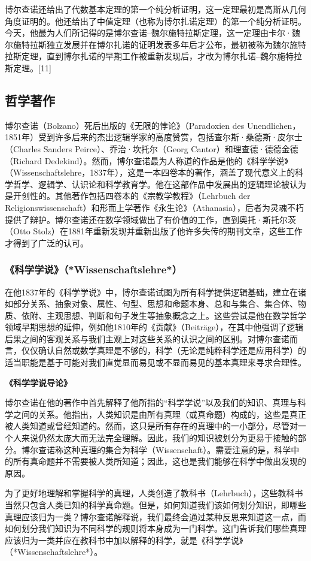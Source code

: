 博尔查诺还给出了代数基本定理的第一个纯分析证明，这一定理最初是高斯从几何角度证明的。他还给出了中值定理（也称为博尔扎诺定理）的第一个纯分析证明。今天，他最为人们所记得的是博尔查诺–魏尔施特拉斯定理，这一定理由卡尔·魏尔施特拉斯独立发展并在博尔扎诺的证明发表多年后才公布，最初被称为魏尔施特拉斯定理，直到博尔扎诺的早期工作被重新发现后，才改为博尔扎诺–魏尔施特拉斯定理。[11]
\subsection{哲学著作}  
博尔查诺（Bolzano）死后出版的《无限的悖论》（Paradoxien des Unendlichen，1851年）受到许多后来的杰出逻辑学家的高度赞赏，包括查尔斯·桑德斯·皮尔士（Charles Sanders Peirce）、乔治·坎托尔（Georg Cantor）和理查德·德德金德（Richard Dedekind）。然而，博尔查诺最为人称道的作品是他的《科学学说》（Wissenschaftslehre，1837年），这是一本四卷本的著作，涵盖了现代意义上的科学哲学、逻辑学、认识论和科学教育学。他在这部作品中发展出的逻辑理论被认为是开创性的。其他著作包括四卷本的《宗教学教程》（Lehrbuch der Religionswissenschaft）和形而上学著作《永生论》（Athanasia），后者为灵魂不朽提供了辩护。博尔查诺还在数学领域做出了有价值的工作，直到奥托·斯托尔茨（Otto Stolz）在1881年重新发现并重新出版了他许多失传的期刊文章，这些工作才得到了广泛的认可。
\subsubsection{《科学学说》（*Wissenschaftslehre*）}  
在他1837年的《科学学说》中，博尔查诺试图为所有科学提供逻辑基础，建立在诸如部分关系、抽象对象、属性、句型、思想和命题本身、总和与集合、集合体、物质、依附、主观思想、判断和句子发生等抽象概念之上。这些尝试是他在数学哲学领域早期思想的延伸，例如他1810年的《贡献》（Beiträge），在其中他强调了逻辑后果之间的客观关系与我们主观上对这些关系的认识之间的区别。对博尔查诺而言，仅仅确认自然或数学真理是不够的，科学（无论是纯粹科学还是应用科学）的适当职能是基于可能对我们直觉显而易见或不显而易见的基本真理来寻求合理性。

\textbf{《科学学说导论》} 
 
博尔查诺在他的著作中首先解释了他所指的“科学学说”以及我们的知识、真理与科学之间的关系。他指出，人类知识是由所有真理（或真命题）构成的，这些是真正被人类知道或曾经知道的。然而，这只是所有存在的真理中的一小部分，尽管对一个人来说仍然太庞大而无法完全理解。因此，我们的知识被划分为更易于接触的部分。博尔查诺称这种真理的集合为科学（Wissenschaft）。需要注意的是，科学中的所有真命题并不需要被人类所知道；因此，这也是我们能够在科学中做出发现的原因。

为了更好地理解和掌握科学的真理，人类创造了教科书（Lehrbuch），这些教科书当然只包含人类已知的科学真命题。但是，如何知道我们该如何划分知识，即哪些真理应该归为一类？博尔查诺解释说，我们最终会通过某种反思来知道这一点，而如何划分我们知识为不同科学的规则将本身成为一门科学。这门告诉我们哪些真理应该归为一类并应在教科书中加以解释的科学，就是《科学学说》（*Wissenschaftslehre*）。

